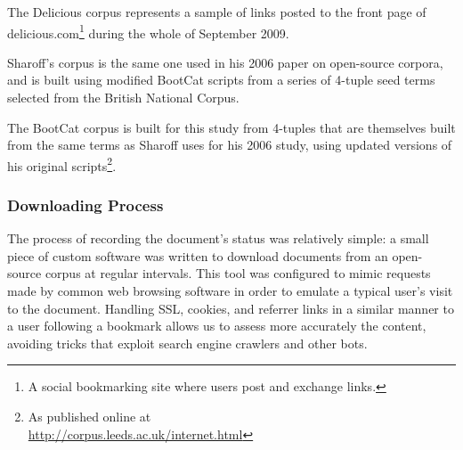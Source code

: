 The Delicious corpus represents a sample of links posted to the front page of delicious.com\footnote{A social bookmarking site where users post and exchange links.} during the whole of September 2009.  

Sharoff's corpus is the same one used in his 2006 paper on open-source corpora, and is built using modified BootCat scripts from a series of 4-tuple seed terms selected from the British National Corpus.

The BootCat corpus is built for this study from 4-tuples that are themselves built from the same terms as Sharoff uses for his 2006 study, using updated versions of his original scripts\footnote{As published online at \\ \url{http://corpus.leeds.ac.uk/internet.html}}.













\subsubsection{Downloading Process}
The process of recording the document's status was relatively simple: a small piece of custom software was written to download documents from an open-source corpus at regular intervals.  This tool was configured to mimic requests made by common web browsing software in order to emulate a typical user's visit to the document. Handling SSL, cookies, and referrer links in a similar manner to a user following a bookmark allows us to assess more accurately the content, avoiding tricks that exploit search engine crawlers and other bots.



